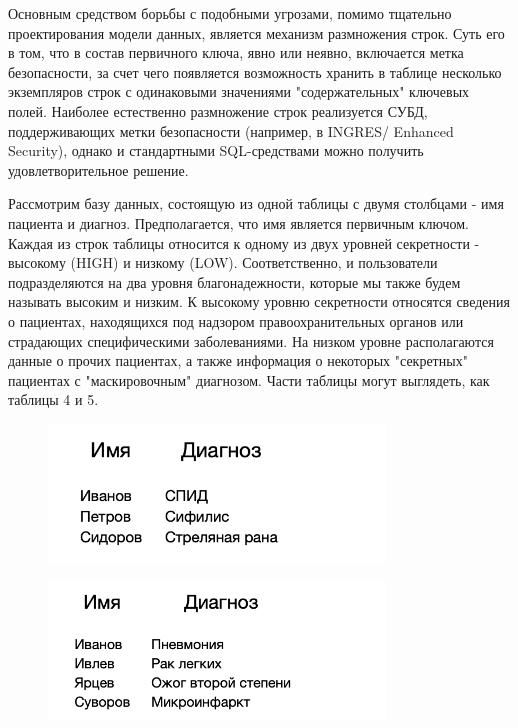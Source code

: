 Основным средством борьбы с подобными угрозами, помимо тщательно проектирования модели данных,
является механизм размножения строк. Суть его в том, что в состав первичного ключа, явно или неявно,
включается метка безопасности, за счет чего появляется возможность хранить в таблице несколько
экземпляров строк с одинаковыми значениями "содержательных" ключевых полей. Наиболее естественно
размножение строк реализуется  СУБД, поддерживающих метки безопасности (например, в INGRES/
Enhanced Security), однако и стандартными SQL-средствами можно получить удовлетворительное решение.

Рассмотрим базу данных, состоящую из одной таблицы с двумя столбцами - имя пациента и диагноз.
Предполагается, что имя является первичным ключом. Каждая из строк таблицы относится к одному
из двух уровней секретности - высокому (HIGH) и низкому (LOW). Соответственно, и пользователи
подразделяются на два уровня благонадежности, которые мы также будем называть высоким и низким.
К высокому уровню секретности относятся сведения о пациентах, находящихся под надзором
правоохранительных органов или страдающих специфическими заболеваниями. На низком уровне
располагаются данные о прочих пациентах, а также информация о некоторых "секретных" пациентах
с "маскировочным" диагнозом. Части таблицы могут выглядеть, как таблицы 4 и 5.

\begin{figure}[h]
    \centering
    \includegraphics[width=0.8\textwidth]{assets/diagnoses1.png}
\end{figure}

\begin{figure}[h]
    \centering
    \includegraphics[width=0.8\textwidth]{assets/diagnoses2.png}
\end{figure}

